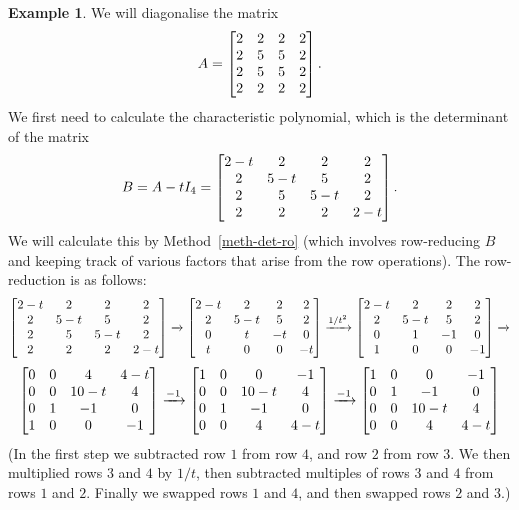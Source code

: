\documentclass[reqno]{amsart}
\theoremstyle{definition}
\newtheorem{example}[theorem]{Example}
\begin{document}
\begin{example}\label{eg-diag-v}
 We will diagonalise the matrix
 \[ A = \left[\begin{matrix} 2&2&2&2 \\ 2&5&5&2 \\ 2&5&5&2 \\ 2&2&2&2 \end{matrix}\right]. \]
 We first need to calculate the characteristic polynomial, which is
 the determinant of the matrix
 \[ B = A-tI_4 = 
      \left[\begin{matrix} 2-t&2&2&2 \\ 2&5-t&5&2 \\ 2&5&5-t&2 \\ 2&2&2&2-t \end{matrix}\right].
 \]
 We will calculate this by Method~\ref{meth-det-ro} (which involves
 row-reducing $B$ and keeping track of various factors that arise from
 the row operations).  The row-reduction is as follows:
 \[
    \left[\begin{matrix} 2-t & 2   & 2   & 2 \\
         2   & 5-t & 5   & 2 \\
         2   & 5   & 5-t & 2 \\
         2   & 2   & 2   & 2-t \end{matrix}\right]
    \xrightarrow{}
    \left[\begin{matrix} 2-t & 2   & 2   & 2 \\
         2   & 5-t & 5   & 2 \\
         0   & t   & -t  & 0 \\
         t   & 0   & 0   & -t \end{matrix}\right]
    \xrightarrow{1/t^2}
    \left[\begin{matrix} 2-t & 2   & 2   & 2 \\
         2   & 5-t & 5   & 2 \\
         0   & 1   & -1  & 0 \\
         1   & 0   & 0   & -1 \end{matrix}\right]
    \xrightarrow{}
 \] \[
    \left[\begin{matrix} 0   & 0   & 4    & 4-t \\
         0   & 0   & 10-t & 4 \\
         0   & 1   & -1   & 0 \\
         1   & 0   & 0    & -1 \end{matrix}\right]
    \xrightarrow{-1}
    \left[\begin{matrix} 1   & 0   & 0    & -1 \\
         0   & 0   & 10-t & 4 \\
         0   & 1   & -1   & 0 \\
         0   & 0   & 4    & 4-t \end{matrix}\right]
    \xrightarrow{-1}
    \left[\begin{matrix} 1   & 0   & 0    & -1 \\
         0   & 1   & -1   & 0 \\
         0   & 0   & 10-t & 4 \\
         0   & 0   & 4    & 4-t \end{matrix}\right]         
 \]
 (In the first step we subtracted row $1$ from row $4$, and row $2$
 from row $3$.  We then multiplied rows $3$ and $4$ by $1/t$, then
 subtracted multiples of rows $3$ and $4$ from rows $1$ and $2$.
 Finally we swapped rows $1$ and $4$, and then swapped rows $2$ and
 $3$.) 


\end{example}
\end{document}
